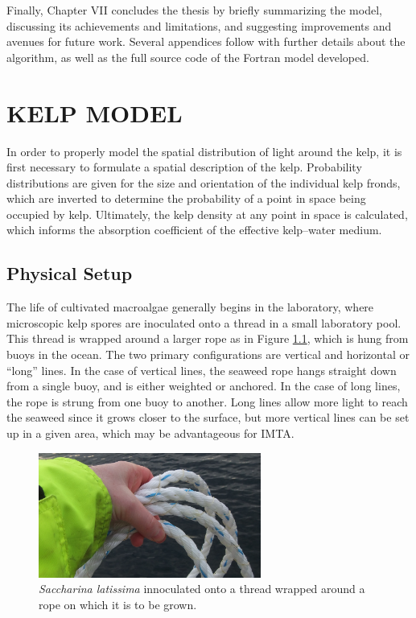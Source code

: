 \documentclass[ms,cpyr,lof,lot]{uathesis}
\begin{document}
Finally, Chapter VII concludes the thesis by briefly summarizing the model, discussing its achievements and limitations, and suggesting improvements and avenues for future work.
Several appendices follow with further details about the algorithm, as well as the full source code of the Fortran model developed.

\chapter{KELP MODEL}
\label{chap:kelp}

In order to properly model the spatial distribution of light around the kelp, it is first necessary to formulate a spatial description of the kelp.
Probability distributions are given for the size and orientation of the individual kelp fronds, which are inverted to determine the probability of a point in space being occupied by kelp.
Ultimately, the kelp density at any point in space is calculated, which informs the absorption coefficient of the effective kelp--water medium.


\section{Physical Setup}
The life of cultivated macroalgae generally begins in the laboratory, where microscopic kelp spores are inoculated onto a thread in a small laboratory pool.
This thread is wrapped around a larger rope as in Figure \ref{fig:rope_thread}, which is hung from buoys in the ocean.
The two primary configurations are vertical and horizontal or ``long'' lines.
In the case of vertical lines, the seaweed rope hangs straight down from a single buoy, and is either weighted or anchored.
In the case of long lines, the rope is strung from one buoy to another.
Long lines allow more light to reach the seaweed since it grows closer to the surface, but more vertical lines can be set up in a given area,
which may be advantageous for IMTA.

\begin{figure}[H]
  \centering
  \includegraphics[width=0.65\textwidth]{kelp_photo/rope_thread}
  \caption{\textit{Saccharina latissima} innoculated onto a thread wrapped around a rope on which it is to be grown.}
  \label{fig:rope_thread}
\end{figure}
\end{document}
